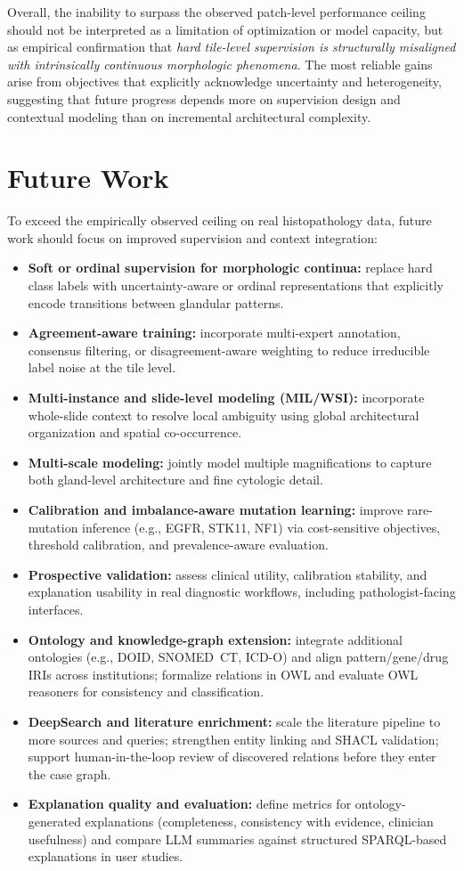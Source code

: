 Overall, the inability to surpass the observed patch-level performance ceiling should not be interpreted as a limitation of optimization or model capacity, but as empirical confirmation that \emph{hard tile-level supervision is structurally misaligned with intrinsically continuous morphologic phenomena}. The most reliable gains arise from objectives that explicitly acknowledge uncertainty and heterogeneity, suggesting that future progress depends more on supervision design and contextual modeling than on incremental architectural complexity.

\section*{Future Work}
To exceed the empirically observed ceiling on real histopathology data, future work should focus on improved supervision and context integration:

\begin{itemize}
  \item \textbf{Soft or ordinal supervision for morphologic continua:} replace hard class labels with uncertainty-aware or ordinal representations that explicitly encode transitions between glandular patterns.
  \item \textbf{Agreement-aware training:} incorporate multi-expert annotation, consensus filtering, or disagreement-aware weighting to reduce irreducible label noise at the tile level.
  \item \textbf{Multi-instance and slide-level modeling (MIL/WSI):} incorporate whole-slide context to resolve local ambiguity using global architectural organization and spatial co-occurrence.
  \item \textbf{Multi-scale modeling:} jointly model multiple magnifications to capture both gland-level architecture and fine cytologic detail.
  \item \textbf{Calibration and imbalance-aware mutation learning:} improve rare-mutation inference (e.g., EGFR, STK11, NF1) via cost-sensitive objectives, threshold calibration, and prevalence-aware evaluation.
  \item \textbf{Prospective validation:} assess clinical utility, calibration stability, and explanation usability in real diagnostic workflows, including pathologist-facing interfaces.
  \item \textbf{Ontology and knowledge-graph extension:} integrate additional ontologies (e.g., DOID, SNOMED~CT, ICD-O) and align pattern/gene/drug IRIs across institutions; formalize relations in OWL and evaluate OWL reasoners for consistency and classification.
  \item \textbf{DeepSearch and literature enrichment:} scale the literature pipeline to more sources and queries; strengthen entity linking and SHACL validation; support human-in-the-loop review of discovered relations before they enter the case graph.
  \item \textbf{Explanation quality and evaluation:} define metrics for ontology-generated explanations (completeness, consistency with evidence, clinician usefulness) and compare LLM summaries against structured SPARQL-based explanations in user studies.
\end{itemize}
